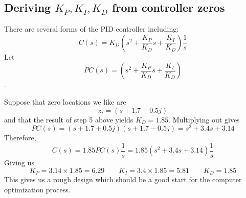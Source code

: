 \subsection{Deriving $K_P, K_I, K_D$ from controller zeros}\label{Kpderive}

There are several forms of the PID controller including: 
\[
C(s) = K_D \left ( s^2+ \frac{K_P}{K_D}s + \frac{K_I}{K_D} \right ) \frac{1}{s}
\]
Let
\[
PC(s) = \left ( s^2+ \frac{K_P}{K_D}s + \frac{K_I}{K_D} \right )
\].

Suppose that zero locations we like are 
\[
z_i = (s + 1.7 \pm 0.5j)
\]
and that the result of step 5 above yields $K_D = 1.85$.   Multiplying out gives
\[
PC(s) = (s + 1.7 + 0.5j)(s + 1.7 - 0.5j)  = s^2 + 3.4s + 3.14
\]
Therefore,
\[
C(s) = 1.85 PC(s) \frac{1}{s} = 1.85(s^2 + 3.4s + 3.14)\frac{1}{s} 
\]
Giving us
\[
K_P = 3.14\times1.85 = 6.29  \qquad  K_I = 3.4\times 1.85 = 5.81 \qquad K_D = 1.85
\]
This gives us a rough design which should be a good start for the computer optimization process. 

 

